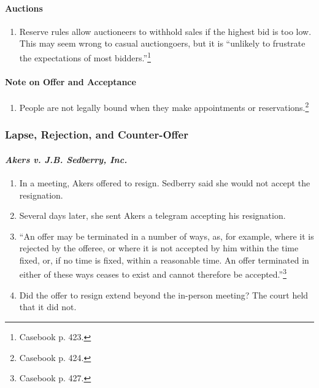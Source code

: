 \paragraph{Auctions}

\begin{enumerate}
    \item Reserve rules allow auctioneers to withhold sales if the highest bid 
    is too low. This may seem wrong to casual auctiongoers, but it is 
    ``unlikely to frustrate the expectations of most 
    bidders.''\footnote{Casebook p. 423.}
\end{enumerate}

\paragraph{Note on Offer and Acceptance}

\begin{enumerate}
    \item People are not legally bound when they make appointments or 
    reservations.\footnote{Casebook p. 424.}
\end{enumerate}

\subsubsection{Lapse, Rejection, and Counter-Offer}

\paragraph{\emph{Akers v. J.B. Sedberry, Inc.}}

\begin{enumerate}
    \item In a meeting, Akers offered to resign. Sedberry said she would not 
    accept the resignation.
    \item Several days later, she sent Akers a telegram accepting his 
    resignation.
    \item ``An offer may be terminated in a number of ways, as, for example, 
    where it is rejected by the offeree, or where it is not accepted by him 
    within the time fixed, or, if no time is fixed, within a reasonable time. 
    An offer terminated in either of these ways ceases to exist and cannot 
    therefore be accepted.''\footnote{Casebook p. 427.}
    \item Did the offer to resign extend beyond the in-person meeting? The 
    court held that it did not.
\end{enumerate}

